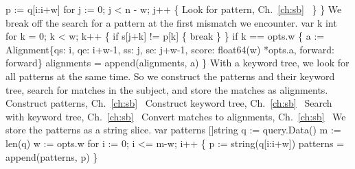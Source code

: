           p := q[i:i+w]
          for j := 0; j < n - w; j++ \{
                  \LA{}Look for pattern, Ch.~\ref{ch:sb}~{\nwtagstyle{}}\RA{}
          \}
\}
\nwendcode{}\nwdocspar
We break off the search for a pattern at the first mismatch we
encounter.
\nwenddocs{}\endmoddef\nwstartdeflinemarkup{}\nwenddeflinemarkup
var k int
for k = 0; k < w; k++ \{
          if s[j+k] != p[k] \{
                  break
          \}
\}
if k == opts.w \{
          a := Alignment\{qs: i, qe: i+w-1, ss: j, se: j+w-1,
                  score: float64(w) *opts.a, forward: forward\}
          alignments = append(alignments, a)
\}
\nwendcode{}\nwdocspar
With a keyword tree, we look for all patterns at the same time. So we
construct the patterns and their keyword tree, search for matches in
the subject, and store the matches as alignments.
\nwenddocs{}\endmoddef\nwstartdeflinemarkup{}\nwenddeflinemarkup
\LA{}Construct patterns, Ch.~\ref{ch:sb}~{\nwtagstyle{}}\RA{}
\LA{}Construct keyword tree, Ch.~\ref{ch:sb}~{\nwtagstyle{}}\RA{}
\LA{}Search with keyword tree, Ch.~\ref{ch:sb}~{\nwtagstyle{}}\RA{}
\LA{}Convert matches to alignments, Ch.~\ref{ch:sb}~{\nwtagstyle{}}\RA{}
\nwendcode{}\nwdocspar
We store the patterns as a string slice.
\nwenddocs{}\endmoddef\nwstartdeflinemarkup{}\nwenddeflinemarkup
var patterns []string
q := query.Data()
m := len(q)
w := opts.w
for i := 0; i <= m-w; i++ \{
          p := string(q[i:i+w])
          patterns = append(patterns, p)
\}
\nwendcode{}\nwdocspar
